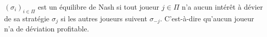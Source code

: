 \begin{rem}
	$(\sigma _{i})_{i\in \Pi}$ est un équilibre de Nash si tout joueur $j \in \Pi$ n'a aucun intérêt à dévier de sa stratégie $\sigma _{j}$ si les autres joueurs suivent $\sigma _{-j}$. C'est-à-dire qu'aucun joueur n'a de déviation profitable. 
\end{rem}




